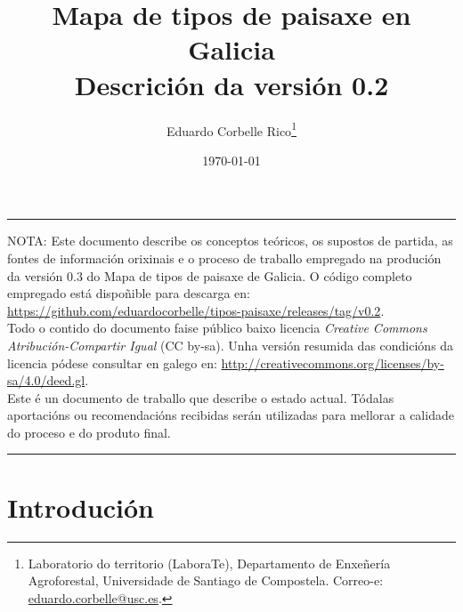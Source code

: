 \documentclass[11pt,a4paper]{article}
\title{Mapa de tipos de paisaxe en Galicia\\Descrición da versión 0.2}
\author{Eduardo Corbelle Rico\thanks{Laboratorio do territorio (LaboraTe), Departamento de Enxeñería Agroforestal, Universidade de Santiago de Compostela. Correo-e: \href{mailto:eduardo.corbelle@usc.es}{eduardo.corbelle@usc.es}.}}
\date{\today}
\begin{document}
\maketitle

\hrule
 \vspace{.2cm}
  \begin{footnotesize}
   \noindent NOTA: Este documento describe os conceptos teóricos, os supostos de partida, as fontes de información orixinais e o proceso de traballo empregado na produción da versión 0.3 do Mapa de tipos de paisaxe de Galicia. O código completo empregado está dispoñible para descarga en: \url{https://github.com/eduardocorbelle/tipos-paisaxe/releases/tag/v0.2}.\\   
Todo o contido do documento faise público baixo licencia \emph{Creative Commons Atribución-Compartir Igual} (CC by-sa). Unha versión resumida das condicións da licencia pódese consultar en galego en: \url{http://creativecommons.org/licenses/by-sa/4.0/deed.gl}.\\
Este é un documento de traballo que describe o estado actual. Tódalas aportacións ou recomendacións recibidas serán utilizadas para mellorar a calidade do proceso e do produto final.
  \end{footnotesize}
 \vspace{.2cm}
\hrule
\bigskip

\section{Introdución}
\end{document}
